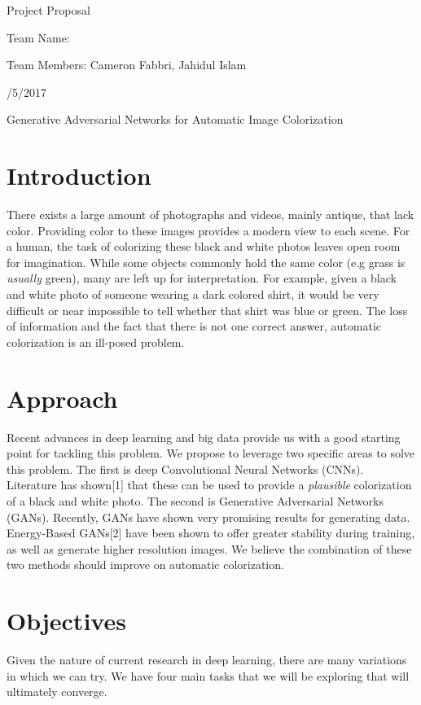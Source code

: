\documentclass{article}
\begin{document}
\centerline{\sc \large Project Proposal}
\vspace{.5pc}
\centerline{\sc Team Name: }
\centerline{\sc Team Members: Cameron Fabbri, Jahidul Islam}
\centerline{/5/2017}
\vspace{2pc}

\centerline{\sc \large Generative Adversarial Networks for Automatic Image Colorization }

\section{Introduction}
There exists a large amount of photographs and videos, mainly antique, that lack color.
Providing color to these images provides a modern view to each scene. For a human,
the task of colorizing these black and white photos leaves open room for imagination. While
some objects commonly hold the same color (e.g grass is \textit{usually} green), many are
left up for interpretation. For example, given a black and white photo of someone wearing a dark
colored shirt, it would be very difficult or near impossible to tell whether that shirt was
blue or green. The loss of information and the fact that there is not one correct answer,
automatic colorization is an ill-posed problem.

\section{Approach}
Recent advances in deep learning and big data provide us with a good starting point for tackling this
problem. We propose to leverage two specific areas to solve this problem. The first is deep Convolutional
Neural Networks (CNNs). Literature has shown[1] that these can be used to provide a \textit{plausible}
colorization of a black and white photo. The second is Generative Adversarial Networks (GANs). Recently,
GANs have shown very promising results for generating data. Energy-Based GANs[2] have been shown to
offer greater stability during training, as well as generate higher resolution images.
We believe the combination of these two methods should improve on automatic colorization.

\section{Objectives}
Given the nature of current research in deep learning, there are many variations in which we
can try. We have four main tasks that we will be exploring that will ultimately converge.
\end{document}

